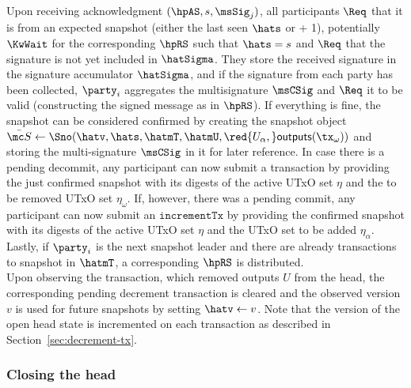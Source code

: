 \quad Upon receiving acknowledgment $(\hpAS,s,\msSig_j)$, all
participants $\Req$ that it is from an expected snapshot (either the last seen
$\hats$ or + 1), potentially $\KwWait$ for the corresponding $\hpRS$ such that
$\hats = s$ and $\Req$ that the signature is not yet included in $\hatSigma$.
They store the received signature in the signature accumulator $\hatSigma$, and
if the signature from each party has been collected, $\party_i$ aggregates the
multisignature $\msCSig$ and $\Req$ it to be valid (constructing the signed
message as in $\hpRS$). If everything is fine, the snapshot can be considered
confirmed by creating the snapshot object
$\bar{\mc S} \gets \Sno(\hatv, \hats, \hatmT, \hatmU, \red{U_{\alpha},} \mathsf{outputs}(\tx_{\omega}))$
and storing the multi-signature $\msCSig$ in it for later reference. In case
there is a pending decommit, any participant can now submit a \mtxDecrement{}
transaction by providing the just confirmed snapshot with its digests of the
active UTxO set $\eta$ and the to be removed UTxO set $\eta_{\omega}$. If, however, there
was a pending commit, any participant can now submit an $\mathtt{incrementTx}$
by providing the confirmed snapshot with its digests of the active UTxO set $\eta$
and the UTxO set to be added $\eta_\alpha$. Lastly, if $\party_i$ is the next snapshot
leader and there are already transactions to snapshot in $\hatmT$, a
corresponding $\hpRS$ is distributed. \\

\quad Upon observing the \mtxDecrement{}
transaction, which removed outputs $U$ from the head, the corresponding pending
decrement transaction is cleared and the observed version $v$ is used for future
snapshots by setting $\hatv \gets v$. Note that the version of the open head state
is incremented on each \mtxDecrement{} transaction as described in
Section~\ref{sec:decrement-tx}. \\


\subsubsection{Closing the head}

